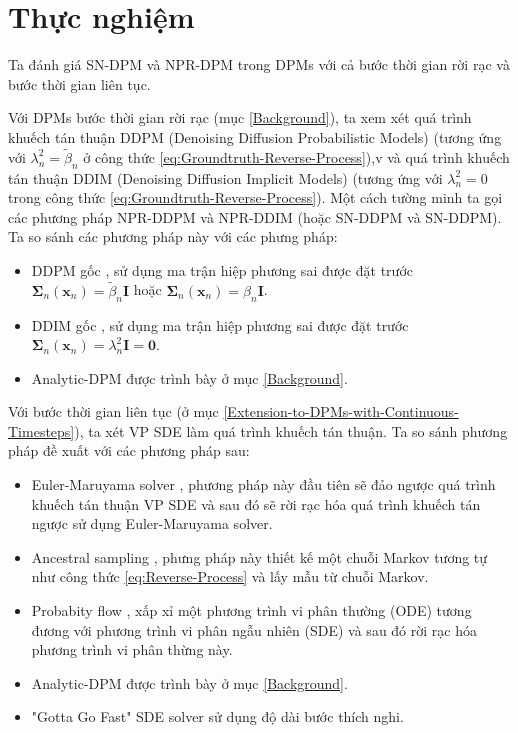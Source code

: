 \documentclass[14pt, a4paper]{article}
\numberwithin{equation}{section}
\numberwithin{figure}{section}
\numberwithin{dl}{section}
\numberwithin{md}{section}
\numberwithin{bd}{section}
\numberwithin{dn}{section}
\numberwithin{hq}{section}
\begin{document}
    \section{Thực nghiệm}

    Ta đánh giá SN-DPM và NPR-DPM trong DPMs với cả bước thời gian rời rạc và bước thời gian liên tục.

    Với DPMs bước thời gian rời rạc (mục \ref{Background}), ta xem xét quá trình khuếch tán thuận DDPM (Denoising Diffusion Probabilistic Models) (tương ứng với $\lambda_n^2 = \tilde{\beta}_n$ ở công thức \ref{eq:Groundtruth-Reverse-Process}),v
    và quá trình khuếch tán thuận DDIM (Denoising Diffusion Implicit Models) (tương ứng với $\lambda_n^2 = 0$ trong công thức \ref{eq:Groundtruth-Reverse-Process}).
    Một cách tường minh ta gọi các phương pháp NPR-DDPM và NPR-DDIM (hoặc SN-DDPM và SN-DDPM). Ta so sánh các phương pháp này với các phưng pháp:

    \begin{itemize}
        \item DDPM gốc \cite{ho2020denoising}, sử dụng ma trận hiệp phương sai được đặt trước $\boldsymbol{\Sigma}_n (\boldsymbol{x}_n)=\tilde{\beta}_n \boldsymbol{I}$ hoặc $\boldsymbol{\Sigma}_n (\boldsymbol{x}_n) = \beta_n \boldsymbol{I}$.
        \item DDIM gốc \cite{song2020denoising}, sử dụng ma trận hiệp phương sai được đặt trước $\boldsymbol{\Sigma}_n (\boldsymbol{x}_n) = \lambda_n^2 \boldsymbol{I} = \boldsymbol{0}$.
        \item Analytic-DPM \cite{bao2021analytic} được trình bày ở mục \ref{Background}.
    \end{itemize}

    Với bước thời gian liên tục (ở mục \ref{Extension-to-DPMs-with-Continuous-Timesteps}), ta xét VP SDE \cite{song2020score} làm quá trình khuếch tán thuận.
    Ta so sánh phương pháp đề xuất với các phương pháp sau:

    \begin{itemize}
        \item Euler-Maruyama solver \cite{song2020score}, phương pháp này đầu tiên sẽ đảo ngược quá trình khuếch tán thuận VP SDE và sau đó sẽ rời rạc hóa quá trình khuếch tán ngược sử dụng Euler-Maruyama solver.
        \item Ancestral sampling \cite{song2020score}, phưng pháp này thiết kế một chuỗi Markov tương tự như công thức \ref{eq:Reverse-Process} và lấy mẫu từ chuỗi Markov.
        \item Probabity flow \cite{song2020score}, xấp xỉ một phương trình vi phân thường (ODE) tương đương với phương trình vi phân ngẫu nhiên (SDE) và sau đó rời rạc hóa phương trình vi phân thừng này.
        \item Analytic-DPM \cite{bao2021analytic} được trình bày ở mục \ref{Background}.
        \item "Gotta Go Fast" SDE solver \cite{jolicoeur2021gotta} sử dụng độ dài bước thích nghi.
    \end{itemize}
\end{document}
